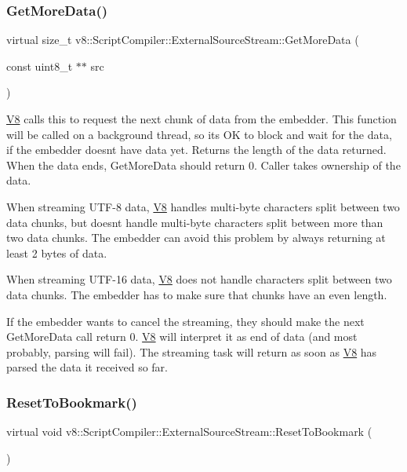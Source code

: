 \subsubsection{\texorpdfstring{Get\+More\+Data()}{GetMoreData()}}
{\footnotesize\ttfamily virtual size\+\_\+t v8\+::\+Script\+Compiler\+::\+External\+Source\+Stream\+::\+Get\+More\+Data (\begin{DoxyParamCaption}\item[{const uint8\+\_\+t $\ast$$\ast$}]{src }\end{DoxyParamCaption})\hspace{0.3cm}{\ttfamily [pure virtual]}}

\mbox{\hyperlink{classv8_1_1V8}{V8}} calls this to request the next chunk of data from the embedder. This function will be called on a background thread, so it\textquotesingle{}s OK to block and wait for the data, if the embedder doesn\textquotesingle{}t have data yet. Returns the length of the data returned. When the data ends, Get\+More\+Data should return 0. Caller takes ownership of the data.

When streaming U\+T\+F-\/8 data, \mbox{\hyperlink{classv8_1_1V8}{V8}} handles multi-\/byte characters split between two data chunks, but doesn\textquotesingle{}t handle multi-\/byte characters split between more than two data chunks. The embedder can avoid this problem by always returning at least 2 bytes of data.

When streaming U\+T\+F-\/16 data, \mbox{\hyperlink{classv8_1_1V8}{V8}} does not handle characters split between two data chunks. The embedder has to make sure that chunks have an even length.

If the embedder wants to cancel the streaming, they should make the next Get\+More\+Data call return 0. \mbox{\hyperlink{classv8_1_1V8}{V8}} will interpret it as end of data (and most probably, parsing will fail). The streaming task will return as soon as \mbox{\hyperlink{classv8_1_1V8}{V8}} has parsed the data it received so far. \mbox{\label{classv8_1_1ScriptCompiler_1_1ExternalSourceStream_a425cf1ba265eeca194b805fe5c52bc19}} 
\subsubsection{\texorpdfstring{Reset\+To\+Bookmark()}{ResetToBookmark()}}
{\footnotesize\ttfamily virtual void v8\+::\+Script\+Compiler\+::\+External\+Source\+Stream\+::\+Reset\+To\+Bookmark (\begin{DoxyParamCaption}{ }\end{DoxyParamCaption})\hspace{0.3cm}{\ttfamily [virtual]}}


